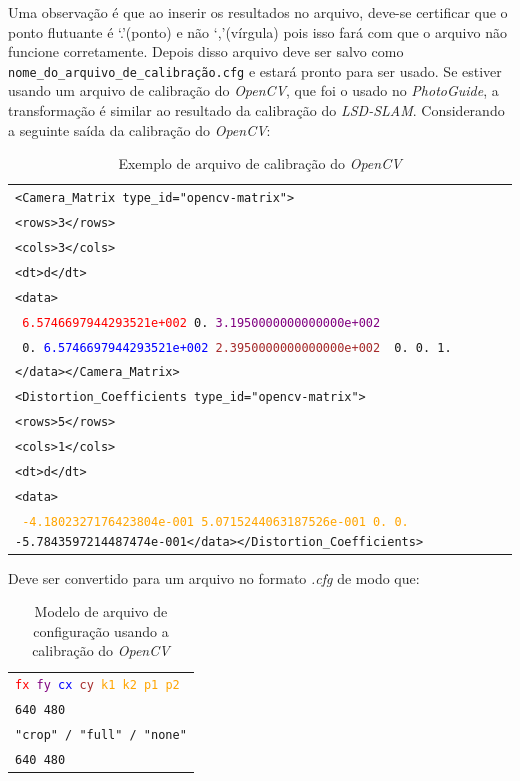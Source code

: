 Uma observação é que ao inserir os resultados no arquivo, deve-se certificar que o ponto flutuante é ‘.’(ponto) e não ‘,’(vírgula) pois isso fará com que o arquivo não funcione corretamente. Depois disso arquivo deve ser salvo como \texttt{nome\_do\_arquivo\_de\_calibração.cfg} e estará pronto para ser usado. Se estiver usando um arquivo de calibração do \textit{OpenCV}, que foi o usado no \textit{PhotoGuide}, a transformação é similar ao resultado da calibração do \textit{LSD-SLAM}. Considerando a seguinte saída da calibração do \textit{OpenCV}:

\begin{table}[H]\label{tb:9}
\begin{tabular}{| p{\textwidth}|}
\hline
\texttt{<Camera\_Matrix type\_id="opencv-matrix">}\\
\texttt{<rows>3</rows>}\\
\texttt{<cols>3</cols>}\\
\texttt{<dt>d</dt>}\\
\texttt{<data>}\\
\texttt{ \textcolor{red}{6.5746697944293521e+002} 0. \textcolor{purple}{3.1950000000000000e+002}}\\
\texttt{ 0. \textcolor{blue}{6.5746697944293521e+002} \textcolor{brown}{2.3950000000000000e+002}}\
\texttt{ 0. 0. 1.}\\
\texttt{</data></Camera\_Matrix>}\\
\texttt{<Distortion\_Coefficients type\_id="opencv-matrix">}\\
\texttt{<rows>5</rows>}\\
\texttt{<cols>1</cols>}\\
\texttt{<dt>d</dt>}\\
\texttt{<data>}\\
\texttt{ \textcolor{orange}{-4.1802327176423804e-001 5.0715244063187526e-001 0. 0.} -5.7843597214487474e-001</data></Distortion\_Coefficients>}\\
 \hline
\end{tabular}
\caption{Exemplo de arquivo de calibração do \textit{OpenCV}}
\end{table}

Deve ser convertido para um arquivo no formato \textit{.cfg} de modo que:

\begin{table}[H]\label{tb:10}
\begin{tabular}{| p{\textwidth}|}
\hline
\texttt{\textcolor{red}{fx} \textcolor{purple}{fy} \textcolor{blue}{cx} \textcolor{brown}{cy} \textcolor{orange}{k1 k2 p1 p2}}\\
\texttt{640 480}\\
\texttt{"crop" / "full" / "none"}\\
\texttt{640 480}\\
 \hline
\end{tabular}
\caption{Modelo de arquivo de configuração usando a calibração do \textit{OpenCV}}
\end{table}


